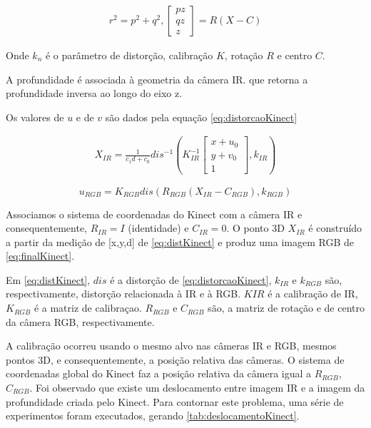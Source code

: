 \begin{gather}
r^2 = p^2+q^2, 
\begin{bmatrix}
pz\\ 
qz\\ 
z
\end{bmatrix} = R(X-C)
\label{eq:relacaoKinect}
\end{gather}



Onde $k_n$ é o parâmetro de distorção, calibração $K$, rotação $R$ e centro $C$.

A profundidade é associada à geometria da câmera IR. que retorna a profundidade inversa ao longo do eixo z.

Os valores de $u$ e de $v$ são dados pela equação \ref{eq:distorcaoKinect} %

\begin{gather} 
X_{IR} = \frac{1}{c_1 d + c_0}dis^{-1}\left ( K^{-1}_{IR}
\begin{bmatrix}
x+u_0\\ 
y+v_0\\ 
1
\end{bmatrix},k_{IR} 
\right )
\label{eq:distKinect}
\end{gather}

\begin{equation}
\label{eq:finalKinect}
u_{RGB} = K_{RGB} dis(R_{RGB}(X_{IR} - C_{RGB}),k_{RGB})
\end{equation}

Associamos o sistema de coordenadas do Kinect com a câmera IR e consequentemente, $R_{IR} = I$ (identidade) e $C_{IR} = 0$. 
O ponto 3D $X_{IR}$ é construído a partir da medição de [x,y,d] de \ref{eq:distKinect} e produz uma imagem RGB de \ref{eq:finalKinect}.

Em \ref{eq:distKinect}, $dis$ é a distorção de \ref{eq:distorcaoKinect}, $k_{IR}$ e $k_{RGB}$ são, respectivamente, distorção relacionada à IR e à RGB. 
$K{IR}$ é a calibração de IR, $K_{RGB}$ é a matriz de calibraçao. $R_{RGB}$ e $C_{RGB}$ são, a matriz de rotação e de centro da câmera RGB, respectivamente.

A calibração ocorreu usando o mesmo alvo nas câmeras IR e RGB, mesmos pontos 3D, e consequentemente, a posição relativa das câmeras.
O sistema de coordenadas global do Kinect faz a posição relativa da câmera igual a $R_{RGB}$, $C_{RGB}$.
Foi observado que existe um deslocamento entre imagem IR e a imagem da profundidade criada pelo Kinect. Para contornar este problema, uma série de experimentos foram executados, gerando \ref{tab:deslocamentoKinect}.

